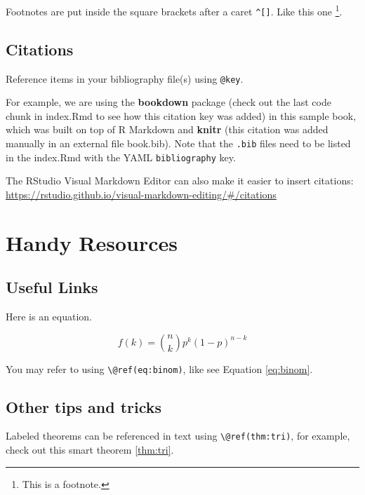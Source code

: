 \documentclass[
]{html}
\theoremstyle{definition}
\theoremstyle{definition}
\theoremstyle{definition}
\theoremstyle{definition}
\theoremstyle{remark}
\begin{document}
Footnotes are put inside the square brackets after a caret \texttt{\^{}{[}{]}}. Like this one \footnote{This is a footnote.}.

\hypertarget{citations}{%
\subsection{Citations}\label{citations}}

Reference items in your bibliography file(s) using \texttt{@key}.

For example, we are using the \textbf{bookdown} package \citep{R-bookdown} (check out the last code chunk in index.Rmd to see how this citation key was added) in this sample book, which was built on top of R Markdown and \textbf{knitr} \citep{xie2015} (this citation was added manually in an external file book.bib).
Note that the \texttt{.bib} files need to be listed in the index.Rmd with the YAML \texttt{bibliography} key.

The RStudio Visual Markdown Editor can also make it easier to insert citations: \url{https://rstudio.github.io/visual-markdown-editing/\#/citations}

\hypertarget{handy-resources}{%
\section{Handy Resources}\label{handy-resources}}

\hypertarget{useful-links}{%
\subsection{Useful Links}\label{useful-links}}

Here is an equation.

\begin{equation} 
  f\left(k\right) = \binom{n}{k} p^k\left(1-p\right)^{n-k}
  \label{eq:binom}
\end{equation}

You may refer to using \texttt{\textbackslash{}@ref(eq:binom)}, like see Equation \eqref{eq:binom}.

\hypertarget{other-tips-and-tricks}{%
\subsection{Other tips and tricks}\label{other-tips-and-tricks}}

Labeled theorems can be referenced in text using \texttt{\textbackslash{}@ref(thm:tri)}, for example, check out this smart theorem \ref{thm:tri}.
\end{document}
